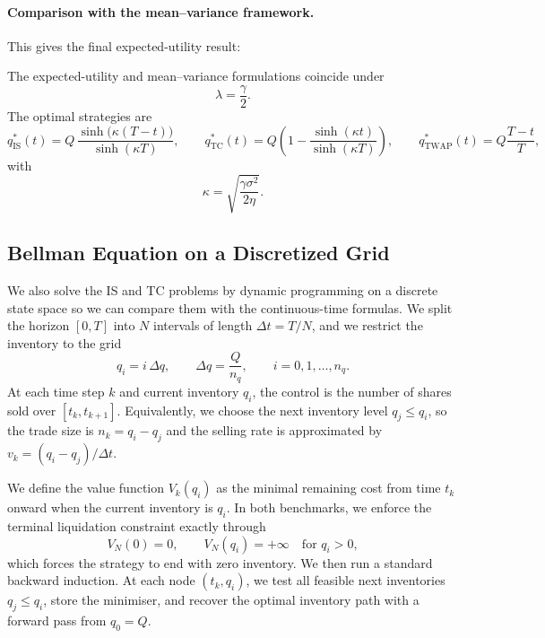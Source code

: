 \documentclass[12pt, a4paper]{article}
\newcommand{\kap}{\kappa}
\begin{document}
\paragraph{Comparison with the mean--variance framework.}

This gives the final expected-utility result:

\begin{resultbox}
  The expected-utility and mean--variance formulations coincide under
  \[
    \boxed{\lambda = \frac{\gamma}{2}}.
  \]
  The optimal strategies are
  \[
    q_{\mathrm{IS}}^*(t)
    =
    Q\,\frac{\sinh\!\bigl(\kap(T-t)\bigr)}{\sinh(\kap T)},
    \qquad
    q_{\mathrm{TC}}^*(t)
    =
    Q\left(1-\frac{\sinh(\kap t)}{\sinh(\kap T)}\right),
    \qquad
    q_{\mathrm{TWAP}}^*(t)
    =
    Q\frac{T-t}{T},
  \]
  with
  \[
    \kap = \sqrt{\frac{\gamma\sigma^2}{2\eta}}.
  \]
\end{resultbox}

\subsection{Bellman Equation on a Discretized Grid}

We also solve the IS and TC problems by dynamic programming on a discrete state space so we can compare them with the continuous-time formulas.
We split the horizon $[0,T]$ into $N$ intervals of length $\Delta t = T/N$, and we restrict the inventory to the grid
\[
  q_i = i\,\Delta q,
  \qquad
  \Delta q = \frac{Q}{n_q},
  \qquad
  i = 0,1,\dots,n_q.
\]
At each time step $k$ and current inventory $q_i$, the control is the number of shares sold over $[t_k,t_{k+1}]$.
Equivalently, we choose the next inventory level $q_j \le q_i$, so the trade size is $n_k = q_i-q_j$ and the selling rate is approximated by $v_k = (q_i-q_j)/\Delta t$.

We define the value function $V_k(q_i)$ as the minimal remaining cost from time $t_k$ onward when the current inventory is $q_i$.
In both benchmarks, we enforce the terminal liquidation constraint exactly through
\[
  V_N(0)=0,
  \qquad
  V_N(q_i)=+\infty \quad \text{for } q_i>0,
\]
which forces the strategy to end with zero inventory.
We then run a standard backward induction.
At each node $(t_k,q_i)$, we test all feasible next inventories $q_j \le q_i$, store the minimiser, and recover the optimal inventory path with a forward pass from $q_0 = Q$.
\end{document}
